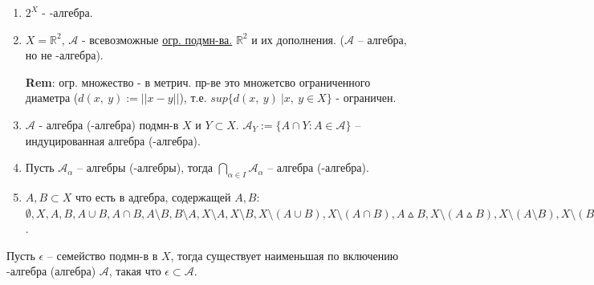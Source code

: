 \begin{example}
    \begin{enumerate}
        \item $2^X$ - \sigma-алгебра.
        
        \item $X = \mathbb{R}^2$, $\mathcal{A}$ - всевозможные \href{https://ru.wikipedia.org/wiki/%D0%9E%D0%B3%D1%80%D0%B0%D0%BD%D0%B8%D1%87%D0%B5%D0%BD%D0%BD%D0%BE%D1%81%D1%82%D1%8C}{огр. подмн-ва.} $\mathbb{R}^2$ и их дополнения. ($\mathcal{A}$ -- алгебра, но не \sigma-алгебра).
        
        \textbf{Rem}: огр. множество - в метрич. пр-ве это множетсво ограниченного диаметра ($d(x, \ y) := || x - y ||$), т.е. $sup\{ d(x, \ y) \ | x, \ y \in X \}$ - ограничен.

        \item $\mathcal{A}$ - алгебра (\sigma-алгебра) подмн-в $X$ и $Y \subset X$. $\mathcal{A}_{Y} := \{A \cap Y : A \in \mathcal{A}\}$ -- индуцированная алгебра (\sigma-алгебра).
        
        \item Пусть $\mathcal{A}_{\alpha}$ -- алгебры (\sigma-алгебры), тогда $\bigcap_{\alpha \in I}\mathcal{A}_{\alpha}$ -- алгебра (\sigma-алгебра).
        
        \item $A, B \subset X$ что есть в адгебра, содержащей $A, B$: \\ $\emptyset, X, A, B, A \cup B, A \cap B, A \setminus B, B \setminus A, X \setminus A, X \setminus B, X \setminus (A \cup B), X \setminus (A \cap B), A \vartriangle B, X \setminus (A \vartriangle B), X \setminus (A \setminus B), X \setminus (B \setminus A)$.
    \end{enumerate}
\end{example}

\begin{theorem}
    Пусть $\epsilon$ -- семейство подмн-в в $X$, тогда существует наименьшая по включению \sigma-алгебра (алгебра) $\mathcal{A}$, такая что $\epsilon \subset \mathcal{A}$.
\end{theorem}

